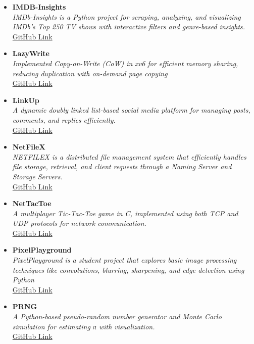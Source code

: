 \begin{itemize}[leftmargin=5mm, label={\small\textbullet}]
    \item \textbf{IMDB-Insights} \\ 
    \textit{IMDb-Insights is a Python project for scraping, analyzing, and visualizing IMDb's Top 250 TV shows with interactive filters and genre-based insights. } \\ 
    \href{https://github.com/shreyasMehta05/IMDB-Insights}{GitHub Link} \
    
    \item \textbf{LazyWrite} \\ 
    \textit{Implemented Copy-on-Write (CoW) in xv6 for efficient memory sharing, reducing duplication with on-demand page copying} \\ 
    \href{https://github.com/shreyasMehta05/LazyWrite}{GitHub Link} \
    
    \item \textbf{LinkUp} \\ 
    \textit{A dynamic doubly linked list-based social media platform for managing posts, comments, and replies efficiently.} \\ 
    \href{https://github.com/shreyasMehta05/LinkUp}{GitHub Link} \
    
    \item \textbf{NetFileX} \\ 
    \textit{NETFILEX is a distributed file management system that efficiently handles file storage, retrieval, and client requests through a Naming Server and Storage Servers.} \\ 
    \href{https://github.com/shreyasMehta05/NetFileX}{GitHub Link} \
    
    \item \textbf{NetTacToe} \\ 
    \textit{A multiplayer Tic-Tac-Toe game in C, implemented using both TCP and UDP protocols for network communication.} \\ 
    \href{https://github.com/shreyasMehta05/NetTacToe}{GitHub Link} \
    
    \item \textbf{PixelPlayground} \\ 
    \textit{ PixelPlayground is a student project that explores basic image processing techniques like convolutions, blurring, sharpening, and edge detection using Python} \\ 
    \href{https://github.com/shreyasMehta05/PixelPlayground}{GitHub Link} \
    
    \item \textbf{PRNG} \\ 
    \textit{A Python-based pseudo-random number generator and Monte Carlo simulation for estimating π with visualization.} \\ 
    \href{https://github.com/shreyasMehta05/PRNG}{GitHub Link} \
    

\end{itemize}

